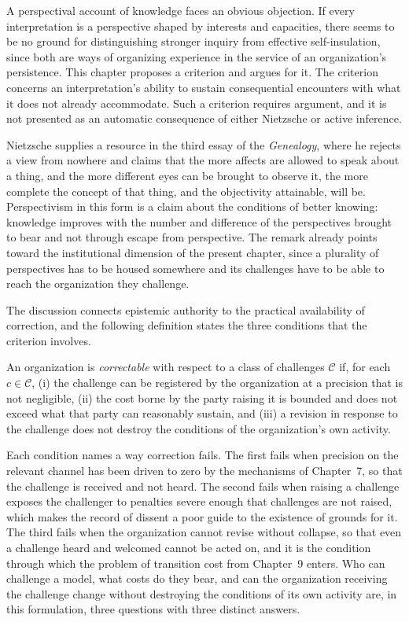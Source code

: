 A perspectival account of knowledge faces an obvious objection. If every interpretation is a perspective shaped by interests and capacities, there seems to be no ground for distinguishing stronger inquiry from effective self-insulation, since both are ways of organizing experience in the service of an organization's persistence. This chapter proposes a criterion and argues for it. The criterion concerns an interpretation's ability to sustain consequential encounters with what it does not already accommodate. Such a criterion requires argument, and it is not presented as an automatic consequence of either Nietzsche or active inference.

Nietzsche supplies a resource in the third essay of the \emph{Genealogy}, where he rejects a view from nowhere and claims that the more affects are allowed to speak about a thing, and the more different eyes can be brought to observe it, the more complete the concept of that thing, and the objectivity attainable, will be. Perspectivism in this form is a claim about the conditions of better knowing: knowledge improves with the number and difference of the perspectives brought to bear and not through escape from perspective. The remark already points toward the institutional dimension of the present chapter, since a plurality of perspectives has to be housed somewhere and its challenges have to be able to reach the organization they challenge.

The discussion connects epistemic authority to the practical availability of correction, and the following definition states the three conditions that the criterion involves.

\begin{definition}[Correctability]
An organization is \emph{correctable} with respect to a class of challenges $\mathcal{C}$ if, for each $c\in\mathcal{C}$, (i) the challenge can be registered by the organization at a precision that is not negligible, (ii) the cost borne by the party raising it is bounded and does not exceed what that party can reasonably sustain, and (iii) a revision in response to the challenge does not destroy the conditions of the organization's own activity.
\end{definition}

Each condition names a way correction fails. The first fails when precision on the relevant channel has been driven to zero by the mechanisms of Chapter~7, so that the challenge is received and not heard. The second fails when raising a challenge exposes the challenger to penalties severe enough that challenges are not raised, which makes the record of dissent a poor guide to the existence of grounds for it. The third fails when the organization cannot revise without collapse, so that even a challenge heard and welcomed cannot be acted on, and it is the condition through which the problem of transition cost from Chapter~9 enters. Who can challenge a model, what costs do they bear, and can the organization receiving the challenge change without destroying the conditions of its own activity are, in this formulation, three questions with three distinct answers.

